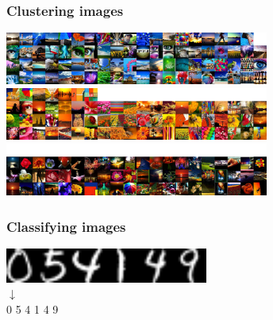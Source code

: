\begin{frame}
  \frametitle{Clustering images}

  \begin{center}
    \includegraphics[width=0.65\textwidth]{../../code/image_data/flickr_vivid_cluster_1.png}
    \vskip10pt
    \includegraphics[width=0.65\textwidth]{../../code/image_data/flickr_vivid_cluster_2.png}
    \includegraphics[width=0.65\textwidth]{../../code/image_data/flickr_vivid_cluster_3.png}

  \end{center}

\end{frame}


\begin{frame}
  \frametitle{Classifying images}

  \begin{center}
    \includegraphics[width=0.5\textwidth]{ocr.png} \\
  \Huge{$\downarrow$} \\
  \Huge{0 \hskip10pt 5 \hskip10pt 4 \hskip10pt 1 \hskip10pt 4 \hskip10pt 9}
  \end{center}

\end{frame}
